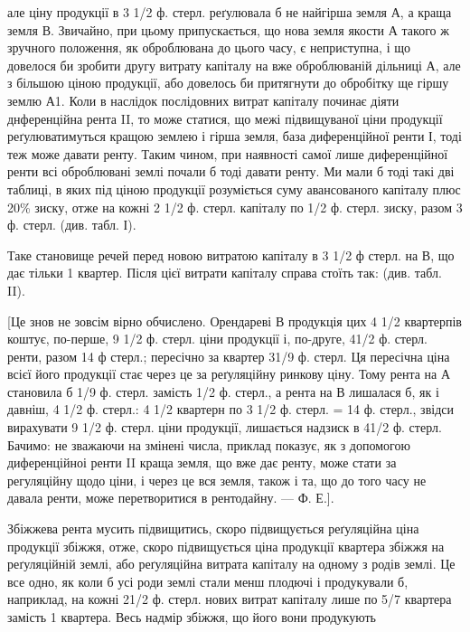 \parcont{}  %
але ціну продукції в 3 1/2 ф. стерл. реґулювала б не найгірша земля А, а краща
земля В. Звичайно, при цьому припускається, що нова земля якости А такого
ж зручного положення, як оброблювана до цього часу, є неприступна, і що довелося
би зробити другу витрату капіталу на вже оброблюваній дільниці А, але
з більшою ціною продукції, або довелось би притягнути до обробітку ще гіршу
землю А1. Коли в наслідок послідовних витрат капіталу починає діяти днференційна
рента II, то може статися, що межі підвищуваної ціни продукції реґулюватимуться
кращою землею і гірша земля, база диференційної ренти І, тоді
теж може давати ренту. Таким чином, при наявності самої лише диференційної
ренти всі оброблювані землі почали б тоді давати ренту. Ми мали б тоді такі
дві таблиці, в яких під ціною продукції розуміється суму авансованого капіталу
плюс 20\%  зиску, отже на кожні 2 1/2 ф. стерл. капіталу по 1/2 ф. стерл.
зиску, разом 3 ф. стерл. (див. табл. І).

Таке становище
речей перед новою
витратою капіталу в
3 1/2 ф стерл. на В,
що дає тільки 1 квартер.
Після цієї витрати
капіталу справа
стоїть так: (див.
табл. II).

[Це знов не зовсім
вірно обчислено.
Орендареві В продукція
цих 4 1/2 квартерпів
коштує, по-перше,
9 1/2 ф. стерл.
ціни продукції і, по-друге,
41/2 ф. стерл.
ренти, разом 14 ф
стерл.; пересічно за
квартер 31/9 ф. стерл.
Ця пересічна ціна
всієї його продукції
стає через це за реґуляційну
ринкову
ціну. Тому рента на
А становила б 1/9 ф.
стерл. замість 1/2 ф. стерл., а рента на В лишалася б, як і давніш, 4 1/2 ф.
стерл.: 4 1/2 квартерн по 3 1/2 ф. стерл. = 14 ф. стерл., звідси вирахувати
9 1/2 ф. стерл. ціни продукції, лишається надзиск в 41/2 ф. стерл. Бачимо: не
зважаючи на змінені числа, приклад показує, як з допомогою диференційноі
ренти II краща земля, що вже дає ренту, може стати за регуляційну щодо ціни,
і через це вся земля, також і та, що до того часу не давала ренти, може перетворитися
в рентодайну. — Ф. Е.].

Збіжжева рента мусить підвищитись, скоро підвищується реґуляційна
ціна продукції збіжжя, отже, скоро підвищується ціна продукції квартера збіжжя
на реґуляційній землі, або реґуляційна витрата капіталу на одному з родів
землі. Це все одно, як коли б усі роди землі стали менш плодючі і продукували
б, наприклад, на кожні 21/2 ф. стерл. нових витрат капіталу лише по 5/7
квартера замість 1 квартера. Весь надмір збіжжя, що його вони продукують

